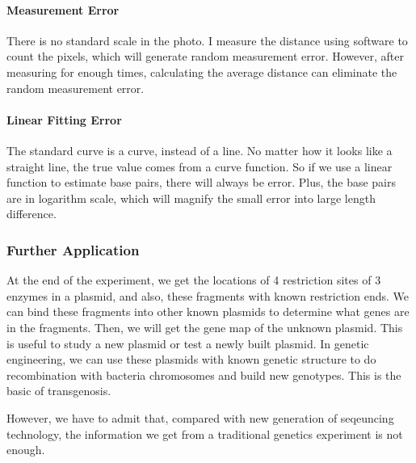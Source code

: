 \documentclass{article}
\begin{document}
                \paragraph{Measurement Error} There is no standard scale in the photo. I measure the distance using software to count the pixels, which will generate random measurement error. However, after measuring for enough times, calculating the average distance can eliminate the random measurement error.

                \paragraph{Linear Fitting Error} The standard curve is a curve, instead of a line. No matter how it looks like a straight line, the true value comes from a curve function. So if we use a linear function to estimate base pairs, there will always be error. Plus, the base pairs are in logarithm scale, which will magnify the small error into large length difference.

            \subsubsection{Further Application}
                At the end of the experiment, we get the locations of 4 restriction sites of 3 enzymes in a plasmid, and also, these fragments with known restriction ends. We can bind these fragments into other known plasmids to determine what genes are in the fragments. Then, we will get the gene map of the unknown plasmid. This is useful to study a new plasmid or test a newly built plasmid. In genetic engineering, we can use these plasmids with known genetic structure to do recombination with bacteria chromosomes and build new genotypes. This is the basic of transgenosis.


                However, we have to admit that, compared with new generation of seqeuncing technology, the information we get from a traditional genetics experiment is not enough. 
\end{document}
